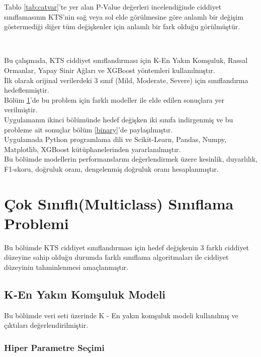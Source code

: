 \documentclass[12pt,twoside]{deuthesis}
\begin{document}
Tablo \ref{tab:catvar}'te yer alan P-Value değerleri incelendiğinde ciddiyet sınıflamasının KTS'nin sağ veya sol elde görülmesine göre anlamlı bir değişim göstermediği diğer tüm değişkenler için anlamlı bir fark olduğu görülmüştür.

~
~

Bu çalışmada, KTS ciddiyet sınıflandırması için K-En Yakın Komşuluk, Rassal Ormanlar, Yapay Sinir Ağları ve XGBoost yöntemleri kullanılmıştır.\\
İlk olarak orijinal verilerdeki 3 sınıf (Mild, Moderate, Severe) için sınıflandırma hedeflenmiştir.\\
Bölüm \ref{multiclass}'de bu problem için farklı modeller ile elde edilen sonuçlara yer verilmiştir.\\
Uygulamanın ikinci bölümünde hedef değişken iki sınıfa indirgenmiş ve bu probleme ait sonuçlar bölüm \ref{binary}'de paylaşılmıştır.\\
Uygulamada Python programlama dili ve Scikit-Learn, Pandas, Numpy, Matplotlib, XGBoost kütüphanelerinden yararlanılmıştır.\\
Bu bölümde modellerin performanslarını değerlendirmek üzere kesinlik, duyarlılık, F1-skoru, doğruluk oranı, dengelenmiş doğruluk oranı hesaplanmıştır.

\hypertarget{multiclass}{%
\section{Çok Sınıflı(Multiclass) Sınıflama Problemi}\label{multiclass}}

Bu bölümde KTS ciddiyet sınıflandırması için hedef değişkenin 3 farklı ciddiyet düzeyine sahip olduğu durumda farklı sınıflama algoritmaları ile ciddiyet düzeyinin tahminlenmesi amaçlanmıştır.

\hypertarget{mult_knn}{%
\subsection{K-En Yakın Komşuluk Modeli}\label{mult_knn}}

Bu bölümde veri seti üzerinde K - En yakın komşuluk modeli kullanılmış ve çıktıları değerlendirilmiştir.

\hypertarget{hiper-parametre-seuxe7imi}{%
\subsubsection{Hiper Parametre Seçimi}\label{hiper-parametre-seuxe7imi}}
\end{document}
